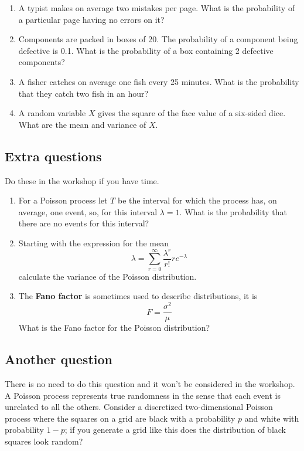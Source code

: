 \documentclass[11pt,a4paper]{scrartcl}
\begin{document}
\begin{enumerate}

  

\item A typist makes on average two mistakes per page. What is the probability of a particular page having no errors on it?

\item Components are packed in boxes of 20. The probability of a component being defective is 0.1. What is the probability of a box containing 2 defective components?
  
\item A fisher catches on average one fish every 25 minutes. What is
  the probability that they catch two fish in an hour?

 \item A random variable $X$ gives the square of the face value of a six-sided dice. What are the mean and variance of $X$.

\end{enumerate}

\subsection*{Extra questions}
Do these in the workshop if you have time.


\begin{enumerate}

\item For a Poisson process let $T$ be the interval for which the
process has, on average, one event, so, for this interval $\lambda=1$. What is the probability that there are no events for this interval?  

\item Starting with the expression for the mean
  \begin{equation}
    \lambda =\sum_{r=0}^\infty \frac{\lambda^r}{r!}re^{-\lambda}
  \end{equation}
  calculate the variance of the Poisson distribution.
  
\item The \textbf{Fano factor} is sometimes used to describe distributions, it is
  \begin{equation}
    F=\frac{\sigma^2}{\mu}
  \end{equation}
What is the Fano factor for the Poisson distribution?

\end{enumerate}

\subsection*{Another question}

There is no need to do this question and it won't be considered in the
workshop. A Poisson process represents true randomness in the sense
that each event is unrelated to all the others. Consider a discretized
two-dimensional Poisson process where the squares on a grid are black
with a probability $p$ and white with probability $1-p$; if you
generate a grid like this does the distribution of black squares look
random?
\end{document}
